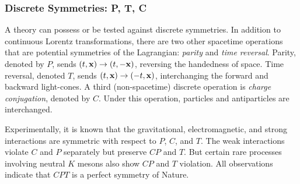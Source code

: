 \subsubsection{Discrete Symmetries: P, T, C}
\label{sec:discrete-symmetries}

A theory can possess or be tested against discrete symmetries. In addition to continuous Lorentz transformations, there are two other spacetime operations that are potential symmetries of the Lagrangian: \emph{parity} and \emph{time reversal}. Parity, denoted by $P$, sends $(t,\vb{x})\rightarrow(t,-\vb{x})$, reversing the handedness of space. Time reversal, denoted $T$, sends $(t,\vb{x})\rightarrow(-t,\vb{x})$, interchanging the forward and backward light-cones. A third (non-spacetime) discrete operation is \emph{charge conjugation}, denoted by $C$. Under this operation, particles and antiparticles are interchanged.

Experimentally, it is known that the gravitational, electromagnetic, and strong interactions are symmetric with respect to $P$, $C$, and $T$. The weak interactions violate $C$ and $P$ separately but preserve $CP$ and $T$. But certain rare processes involving neutral $K$ mesons also show $CP$ and $T$ violation. All observations indicate that $CPT$ is a perfect symmetry of Nature.


